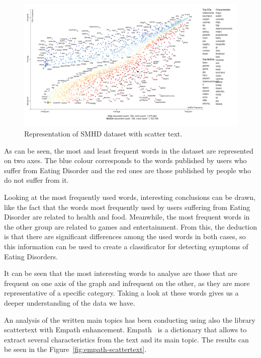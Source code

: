 \begin{figure}[!htp]
    \centering
    \includegraphics[scale=0.7]{img/detection/scattertext.png}
    \caption{Representation of SMHD dataset with scatter text.}
    \label{fig:scattertext}
\end{figure}

As can be seen, the most and least frequent words in the dataset are represented on two axes. The blue colour corresponds to the words published by users who suffer from Eating Disorder and the red ones are those published by people who do not suffer from it.

Looking at the most frequently used words, interesting conclusions can be drawn, like the fact that the words most frequently used by users suffering from Eating Disorder are related to health and food. Meanwhile, the most frequent words in the other group are related to games and entertainment. From this, the deduction is that there are significant differences among the used words in both cases, so this information can be used to create a classificator for detecting symptoms of Eating Disorders.

It can be seen that the most interesting words to analyse are those that are frequent on one axis of the graph and infrequent on the other, as they are more representative of a specific category. Taking a look at these words gives us a deeper understanding of the data we have.

An analysis of the written main topics has been conducting using also the library scattertext with Empath enhancement. Empath~\cite{empath} is a dictionary that allows to extract several characteristics from the text and its main topic. The results can be seen in the Figure~\ref{fig:empath-scattertext}.

